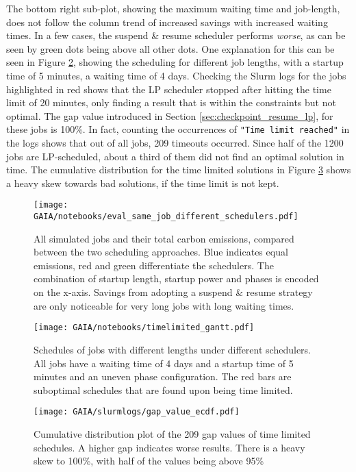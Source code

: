 The bottom right sub-plot, showing the maximum waiting time and job-length, does not follow the column trend of increased savings with increased waiting times. In a few cases, the suspend \& resume scheduler performs \emph{worse}, as can be seen by green dots being above all other dots.
One explanation for this can be seen in Figure \ref{fig:timelimited_gantt}, showing the scheduling for different job lengths, with a startup time of 5 minutes, a waiting time of 4 days.
Checking the Slurm logs for the jobs highlighted in red shows that the LP scheduler stopped after hitting the time limit of 20 minutes, only finding a result that is within the constraints but not optimal.
The gap value introduced in Section \ref{sec:checkpoint_resume_lp}, for these jobs is 100\%.
In fact, counting the occurrences of \verb|"Time limit reached"| in the logs shows that out of all jobs, 209 timeouts occurred. 
Since half of the 1200 jobs are LP-scheduled, about a third of them did not find an optimal solution in time.
The cumulative distribution for the time limited solutions in Figure \ref{fig:ecdf_gap} shows a heavy skew towards bad solutions, if the time limit is not kept.

\begin{figure}
    \texttt{[image: GAIA/notebooks/eval\_same\_job\_different\_schedulers.pdf]}
    \caption[short]{All simulated jobs and their total carbon emissions, compared between the two scheduling approaches. Blue indicates equal emissions, red and green differentiate the schedulers. The combination of startup length, startup power and phases is encoded on the x-axis. Savings from adopting a suspend \& resume strategy are only noticeable for very long jobs with long waiting times.}
    \label{fig:eval_different_schedulers}
\end{figure}

\begin{figure}
    \texttt{[image: GAIA/notebooks/timelimited\_gantt.pdf]}
    \caption[short]{Schedules of jobs with different lengths under different schedulers. All jobs have a waiting time of 4 days and a startup time of 5 minutes and an uneven phase configuration. The red bars are suboptimal schedules that are found upon being time limited.}
    \label{fig:timelimited_gantt}
\end{figure}

\begin{figure}
    \texttt{[image: GAIA/slurmlogs/gap\_value\_ecdf.pdf]}
    \caption[short]{Cumulative distribution plot of the 209 gap values of time limited schedules. A higher gap indicates worse results. There is a heavy skew to 100\%, with half of the values being above 95\%}
    \label{fig:ecdf_gap}
\end{figure}

